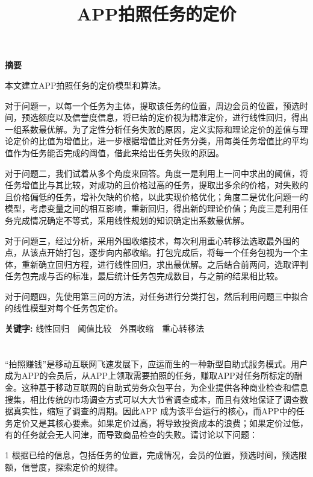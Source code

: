 \documentclass{ctexart}
\date{}
\title{\begin{huge} \textbf{APP拍照任务的定价}  \end{huge}}
\begin{document}
\maketitle


\begin{large}
\textbf{摘要}

本文建立APP拍照任务的定价模型和算法。

对于问题一，以每一个任务为主体，提取该任务的位置，周边会员的位置，预选时间，预选额度以及信誉度信息，将已给的定价视为精准定价，进行线性回归，得出一组系数最优解。为了定性分析任务失败的原因，定义实际和理论定价的差值与理论定价的比值为增值比，进一步根据增值比对任务分类，用每类任务增值比的平均值作为任务能否完成的阈值，借此来给出任务失败的原因。

对于问题二，我们试着从多个角度来回答。角度一是利用上一问中求出的阈值，将任务增值比与其比较，对成功的且价格过高的任务，提取出多余的价格，对失败的且价格偏低的任务，增补欠缺的价格，以此实现价格优化；角度二是优化问题一的模型，考虑变量之间的相互影响，重新回归，得出新的理论价值；角度三是利用任务完成情况确定不等式，采用线性规划的知识确定出系数最优解。

对于问题三，经过分析，采用外围收缩技术，每次利用重心转移法选取最外围的点，从该点开始打包，逐步向内部收缩。打包完成后，将每一个任务包视为一个主体，重新确立回归方程，进行线性回归，求出最优解。之后结合前两问，选取评判任务包完成与否的标准，最后统计任务包完成数目，与之前的结果相比较。

对于问题四，先使用第三问的方法，对任务进行分类打包，然后利用问题三中拟合的线性模型对每个任务包定价。



\textbf{关键字:}
线性回归\ \ 阈值比较\ \ 外围收缩\ \ 重心转移法
\end{large}
\newpage
 \section{}
“拍照赚钱”是移动互联网飞速发展下，应运而生的一种新型自助式服务模式。用户成为APP的会员后，从APP上领取需要拍照的任务，赚取APP对任务所标定的酬金。这种基于移动互联网的自助式劳务众包平台，为企业提供各种商业检查和信息搜集，相比传统的市场调查方式可以大大节省调查成本，而且有效地保证了调查数据真实性，缩短了调查的周期。因此APP 成为该平台运行的核心，而APP中的任务定价又是其核心要素。如果定价过高，将导致投资成本的浪费；如果定价过低，有的任务就会无人问津，而导致商品检查的失败。请讨论以下问题：

\textcircled{\small{1}} 根据已给的信息，包括任务的位置，完成情况，会员的位置，预选时间，预选限额，信誉度，探索定价的规律。
\end{document}
